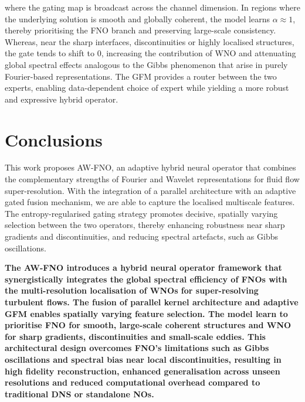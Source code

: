 \documentclass[11pt,a4paper]{article}
\begin{document}
where the gating map is broadcast across the channel dimension. In regions where the underlying solution is smooth and globally coherent, the model learns \(\alpha \approx 1\), thereby prioritising the FNO branch and preserving large-scale consistency. Whereas, near the sharp interfaces, discontinuities or highly localised structures, the gate tends to shift to $0$, increasing the contribution of WNO and attenuating global spectral effects analogous to the Gibbs phenomenon that arise in purely Fourier-based representations. The GFM provides a router between the two experts, enabling data-dependent choice of expert while yielding a more robust and expressive hybrid operator.





\section{Conclusions}

This work proposes AW-FNO, an adaptive hybrid neural operator that combines the complementary strengths of Fourier and Wavelet representations for fluid flow super-resolution. With the integration of a parallel architecture with an adaptive gated fusion mechanism, we are able to capture the localised multiscale features. The entropy-regularised gating strategy promotes decisive, spatially varying selection between the two operators, thereby enhancing robustness near sharp gradients and discontinuities, and reducing spectral artefacts, such as Gibbs oscillations.

\textbf{The AW-FNO introduces a hybrid neural operator framework that synergistically integrates the global spectral efficiency of FNOs with the multi-resolution localisation of WNOs for super-resolving turbulent flows. The fusion of parallel kernel architecture and adaptive GFM enables spatially varying feature selection. The model learn to prioritise FNO for smooth, large-scale coherent structures and WNO for sharp gradients, discontinuities and small-scale eddies. This architectural design overcomes FNO's limitations such as Gibbs oscillations and spectral bias near local discontinuities, resulting in high fidelity reconstruction, enhanced generalisation across unseen resolutions and reduced computational overhead compared to traditional DNS or standalone NOs.}
\end{document}
